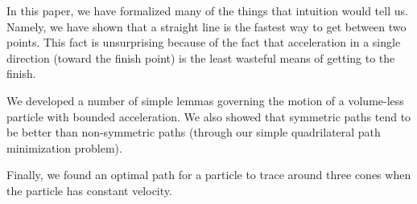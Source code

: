 In this paper, we have formalized many of the things that intuition would tell us. Namely, we have shown that a straight line is the fastest way to get between two points. This fact is unsurprising because of the fact that acceleration in a single direction (toward the finish point) is the least wasteful means of getting to the finish.

We developed a number of simple lemmas governing the motion of a volume-less particle with bounded acceleration. We also showed that symmetric paths tend to be better than non-symmetric paths (through our simple quadrilateral path minimization problem).

Finally, we found an optimal path for a particle to trace around three cones when the particle has constant velocity.
